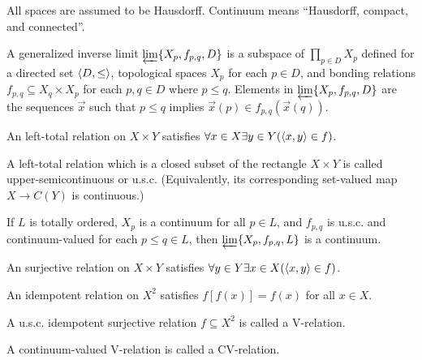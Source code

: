 \documentclass[11pt]{article}
\newcommand{\vect}{\vec}
\begin{document}
  All spaces are assumed to be Hausdorff. Continuum means ``Hausdorff, compact,
  and connected''.

  \begin{definition}
    A generalized inverse limit \(\varprojlim \{X_p, f_{p,q}, D\}\) is a
    subspace of \(\prod_{p\in D}X_p\) defined for
    a directed set \(\langle D,\leq\rangle\),
    topological spaces \(X_p\) for each \(p\in D\),
    and bonding relations \(f_{p,q}\subseteq X_q\times X_p\) for each
    \(p,q\in D\) where \(p\leq q\). Elements in
    \(\varprojlim \{X_p, f_{p,q}, D\}\)
    are the sequences \(\vect x\) such that \(p\leq q\) implies
    \(\vect x(p)\in f_{p,q}(\vect x(q))\).
  \end{definition}

  \begin{definition}
    An left-total relation on \(X\times Y\) satisfies
    \(\forall x\in X\exists y\in Y(\langle x,y\rangle\in f)\).
  \end{definition}

  \begin{definition}
    A left-total relation which is a closed subset of the rectangle
    \(X\times Y\) is called upper-semicontinuous or u.s.c.
    (Equivalently, its corresponding set-valued map \(X\to C(Y)\)
    is continuous.)
  \end{definition}

  \begin{theorem}
    If \(L\) is totally ordered, \(X_p\) is a continuum for all \(p\in L\),
    and \(f_{p,q}\) is u.s.c. and continuum-valued for each \(p\leq q\in L\),
    then \(\varprojlim\{X_p,f_{p,q},L\}\) is a continuum.
  \end{theorem}

  \begin{definition}
    An surjective relation on \(X\times Y\) satisfies
    \(\forall y\in Y\exists x\in X(\langle x,y\rangle\in f)\).
  \end{definition}

  \begin{definition}
    An idempotent relation on \(X^2\) satisfies \(f[f(x)]=f(x)\) for all
    \(x\in X\).
  \end{definition}

  \begin{definition}
    A u.s.c. idempotent surjective relation
    \(f\subseteq X^2\) is called a V-relation.
  \end{definition}

  \begin{definition}
    A continuum-valued V-relation is called a CV-relation.
  \end{definition}
\end{document}

